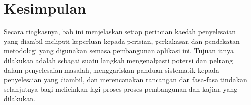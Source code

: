 \section{Kesimpulan}
Secara ringkasnya, bab ini menjelaskan setiap perincian kaedah penyelesaian yang diambil meliputi keperluan kepada perisian, perkakasan dan pendekatan metodologi yang digunakan semasa pembangunan aplikasi ini. Tujuan ianya dilakukan adalah sebagai suatu langkah mengenalpasti potensi dan peluang dalam penyelesaian masalah, menggariskan panduan sistematik kepada penyelesaian yang diambil, dan merencanakan rancangan dan fasa-fasa
tindakan selanjutnya bagi melicinkan lagi proses-proses pembangunan dan kajian yang dilakukan.
